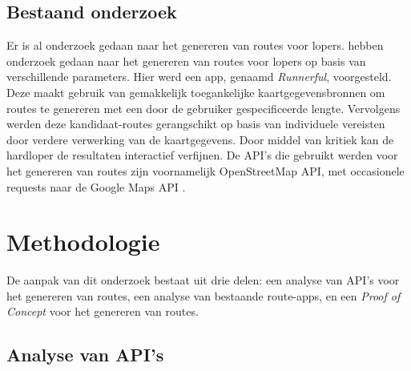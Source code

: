 \subsection{Bestaand onderzoek}
Er is al onderzoek gedaan naar het genereren van routes voor lopers.
\textcite{Loepp2018} hebben onderzoek gedaan naar het genereren van routes voor lopers op basis van verschillende parameters.
Hier werd een app, genaamd \emph{Runnerful}, voorgesteld.
Deze maakt gebruik van gemakkelijk toegankelijke kaartgegevensbronnen om routes te genereren met een door de gebruiker gespecificeerde lengte.
Vervolgens werden  deze kandidaat-routes gerangschikt op basis van individuele vereisten door verdere verwerking van de kaartgegevens.
Door middel van kritiek kan de hardloper de resultaten interactief verfijnen.
De API's die gebruikt werden voor het genereren van routes zijn voornamelijk OpenStreetMap API,
met occasionele requests naar de Google Maps API \autocite{Loepp2018}.


\section{Methodologie}%
\label{sec:methodologie}

De aanpak van dit onderzoek bestaat uit drie delen: een analyse van API's voor het genereren van routes, een analyse van bestaande route-apps, en een \emph{Proof of Concept} voor het genereren van routes.

\subsection{Analyse van API's}

